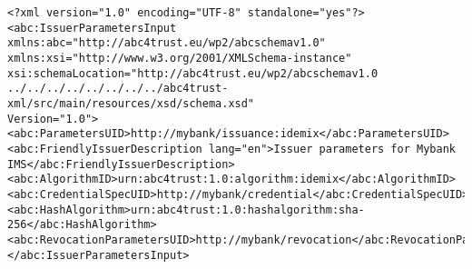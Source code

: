 \begin{lstlisting}[caption=IDEMIX Parameters Input]
<?xml version="1.0" encoding="UTF-8" standalone="yes"?>
<abc:IssuerParametersInput 
xmlns:abc="http://abc4trust.eu/wp2/abcschemav1.0"
xmlns:xsi="http://www.w3.org/2001/XMLSchema-instance" 
xsi:schemaLocation="http://abc4trust.eu/wp2/abcschemav1.0 ../../../../../../../../abc4trust-xml/src/main/resources/xsd/schema.xsd"
Version="1.0">
<abc:ParametersUID>http://mybank/issuance:idemix</abc:ParametersUID>
<abc:FriendlyIssuerDescription lang="en">Issuer parameters for Mybank IMS</abc:FriendlyIssuerDescription>
<abc:AlgorithmID>urn:abc4trust:1.0:algorithm:idemix</abc:AlgorithmID>
<abc:CredentialSpecUID>http://mybank/credential</abc:CredentialSpecUID>
<abc:HashAlgorithm>urn:abc4trust:1.0:hashalgorithm:sha-256</abc:HashAlgorithm>
<abc:RevocationParametersUID>http://mybank/revocation</abc:RevocationParametersUID>
</abc:IssuerParametersInput>
\end{lstlisting}
